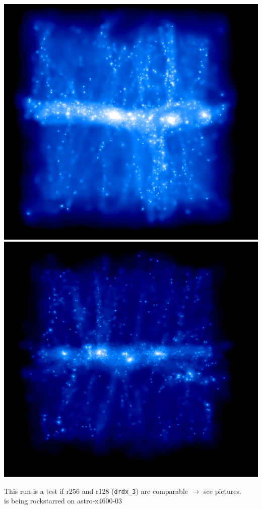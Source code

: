 \documentclass[a4paper,11pt,fleqn,oneside]{book}
\begin{document}
\includegraphics[scale=0.2]{drdx_3_r256/4.png} 
\includegraphics[scale=0.2]{drdx_3_r256/3.png} 


This run is a test if r256 and r128 (\texttt{drdx\_3}) 
are comparable $\rightarrow$ see pictures. \\
is being rockstarred on astro-x4600-03 \\
\end{document}
